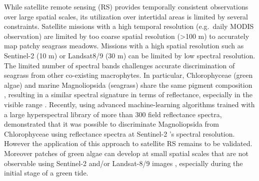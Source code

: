 \documentclass[
  number]{elsarticle}
\begin{document}
While satellite remote sensing (RS) provides temporally consistent
observations over large spatial scales, its utilization over intertidal
areas is limited by several constraints. Satellite missions with a high
temporal resolution (e.g.~daily MODIS observation) are limited by too
coarse spatial resolution (\textgreater100 m) to accurately map patchy
seagrass meadows. Missions with a high spatial resolution such as
Sentinel-2 (10 m) or Landsat8/9 (30 m) can be limited by low spectral
resolution. The limited number of spectral bands challenges accurate
discrimination of seagrass from other co-existing macrophytes. In
particular, Chlorophyceae (green algae) and marine Magnoliopsida
(seagrass) share the same pigment composition
\citep{ralph2002, Douay2022}, resulting in a similar spectral signature
in terms of reflectance, especially in the visible range
\citep{Davies2023, bannari2022}. Recently, using advanced
machine-learning algorithms trained with a large hyperspectral library
of more than 300 field reflectance spectra, \citep{Davies2023}
demonstrated that it was possible to discriminate Magnoliopsida from
Chlorophyceae using reflectance spectra at Sentinel-2 's spectral
resolution. However the application of this approach to satellite RS
remains to be validated. Moreover patches of green algae can develop at
small spatial scales that are not observable using Sentinel-2 and/or
Landsat-8/9 images \citep{tuya2013}, especially during the initial stage
of a green tide.
\end{document}
